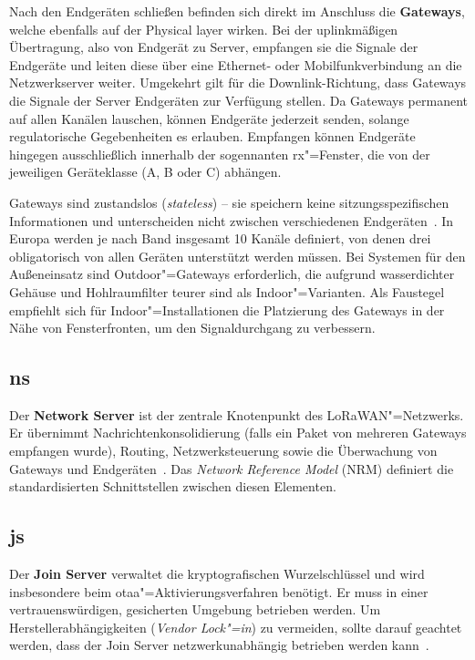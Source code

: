 Nach den Endgeräten schließen befinden sich direkt im Anschluss die \textbf{Gateways}, welche ebenfalls auf der Physical layer %
wirken. Bei der uplinkmäßigen Übertragung, also von Endgerät zu Server, empfangen sie die Signale der Endgeräte und leiten 
diese über eine Ethernet- oder Mobilfunkverbindung an die Netzwerkserver weiter. Umgekehrt gilt für die Downlink-Richtung, 
dass Gateways die Signale der Server Endgeräten zur Verfügung stellen. Da Gateways permanent auf allen Kanälen lauschen, 
können Endgeräte jederzeit senden, solange regulatorische Gegebenheiten es erlauben. Empfangen können Endgeräte hingegen
ausschließlich innerhalb der sogennanten \acrshort{rx}"=Fenster, die von der jeweiligen Geräteklasse (A, B oder C) abhängen. 

Gateways sind zustandslos (\textit{stateless}) -- sie speichern keine
sitzungsspezifischen Informationen und unterscheiden nicht zwischen verschiedenen
Endgeräten~\cite{lorawan_spec}. In Europa werden je nach Band insgesamt 10 Kanäle
definiert, von denen drei obligatorisch von allen Geräten unterstützt werden müssen.
Bei Systemen für den Außeneinsatz sind Outdoor"=Gateways erforderlich, die aufgrund
wasserdichter Gehäuse und Hohlraumfilter teurer sind als Indoor"=Varianten. Als
Faustegel empfiehlt sich für Indoor"=Installationen die Platzierung des Gateways in
der Nähe von Fensterfronten, um den Signaldurchgang zu verbessern.

\subsection{\acrfull{ns}}

Der \textbf{Network Server} ist der zentrale Knotenpunkt des LoRaWAN"=Netzwerks. Er
übernimmt Nachrichtenkonsolidierung (falls ein Paket von mehreren Gateways empfangen
wurde), Routing, Netzwerksteuerung sowie die Überwachung von Gateways und
Endgeräten~\cite{lorawan_spec}. Das \textit{Network Reference Model} (NRM) definiert
die standardisierten Schnittstellen zwischen diesen Elementen.

\subsection{\acrfull{js}}

Der \textbf{Join Server} verwaltet die kryptografischen Wurzelschlüssel und wird
insbesondere beim \acrlong{otaa}"=Aktivierungsverfahren benötigt. Er muss in einer
vertrauenswürdigen, gesicherten Umgebung betrieben werden. Um Herstellerabhängigkeiten
(\textit{Vendor Lock"=in}) zu vermeiden, sollte darauf geachtet werden, dass der Join
Server netzwerkunabhängig betrieben werden kann~\cite{semtech_lora_basics}.

